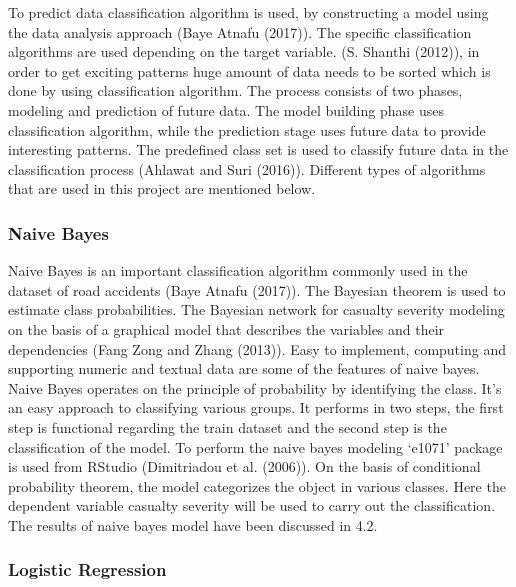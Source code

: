 \documentclass[
  a4paper,
]{article}
\begin{document}
To predict data classification algorithm is used, by constructing a
model using the data analysis approach (Baye Atnafu (2017)). The
specific classification algorithms are used depending on the target
variable. (S. Shanthi (2012)), in order to get exciting patterns huge
amount of data needs to be sorted which is done by using classification
algorithm. The process consists of two phases, modeling and prediction
of future data. The model building phase uses classification algorithm,
while the prediction stage uses future data to provide interesting
patterns. The predefined class set is used to classify future data in
the classification process (Ahlawat and Suri (2016)). Different types of
algorithms that are used in this project are mentioned below.

\hypertarget{naive-bayes}{%
\subsubsection{Naive Bayes}\label{naive-bayes}}

Naive Bayes is an important classification algorithm commonly used in
the dataset of road accidents (Baye Atnafu (2017)). The Bayesian theorem
is used to estimate class probabilities. The Bayesian network for
casualty severity modeling on the basis of a graphical model that
describes the variables and their dependencies (Fang Zong and Zhang
(2013)). Easy to implement, computing and supporting numeric and textual
data are some of the features of naive bayes. Naive Bayes operates on
the principle of probability by identifying the class. It's an easy
approach to classifying various groups. It performs in two steps, the
first step is functional regarding the train dataset and the second step
is the classification of the model. To perform the naive bayes modeling
`e1071' package is used from RStudio (Dimitriadou et al. (2006)). On the
basis of conditional probability theorem, the model categorizes the
object in various classes. Here the dependent variable casualty severity
will be used to carry out the classification. The results of naive bayes
model have been discussed in 4.2.

\hypertarget{logistic-regression}{%
\subsubsection{Logistic Regression}\label{logistic-regression}}
\end{document}
